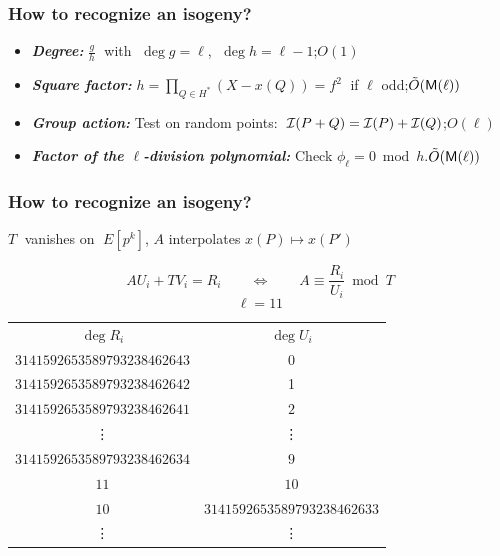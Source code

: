 \documentclass[10pt,usepdftitle=false]{beamer}
\begin{document}
\begin{frame}
  \frametitle{How to recognize an isogeny?}

  \begin{itemize}
    \setlength{\itemsep}{\baselineskip}
  \item \emph{\textbf{Degree:}} $\frac{g}{h}\;$ with $\;\deg g=\ell$, $\;\deg h = \ell-1$;\hfill\alert{$O(1)$}
  \item \emph{\textbf{Square factor:}} $h = \prod_{Q\in H^\ast}(X-
    x(Q)) = f^2\;$ if $\ell$ odd;\hfill\emph{$\tilde{O}(\mathsf{M}(\ell))$}
  \item \emph{\textbf{Group action:}} Test on random points: $\;\mathcal{I}(P+Q)=\mathcal{I}(P)+\mathcal{I}(Q)$;\hfill\emph{$O(\ell)$}
  \item \emph{\textbf{Factor of the $\ell$-division polynomial:}}
    Check $\phi_\ell=0\bmod h$.\hfill\emph{$\tilde{O}(\mathsf{M}(\ell))$}
  \end{itemize}
\end{frame}


\begin{frame}
  \frametitle{How to recognize an isogeny?}
  
  \begin{center}
    $T\;$ vanishes on $\;E[p^k]$, $A$ interpolates $x(P)\mapsto x(P')$
  \end{center}
  
  \[AU_i + TV_i = R_i  \qquad\Leftrightarrow\qquad  A\equiv \frac{R_i}{U_i} \bmod T\]
  \[\ell = 11\]
  \pause
  \begin{center}
  \begin{tabular}{c | c}
    $\deg R_i$ & $\deg U_i$ \\
    $3141592653589793238462643$ & 0 \\
    \pause
    $3141592653589793238462642$ & 1 \\
    \pause
    $3141592653589793238462641$ & $2$ \\
    \pause
    \vdots & \vdots\\
    $3141592653589793238462634$ & $9$ \\
    \pause
    \Huge\alert{$11$} & \Huge\alert{$10$}\\
    \pause
    $10$ & $3141592653589793238462633$\\
    \vdots & \vdots
  \end{tabular}
  \end{center}
\end{frame}

\end{document}
